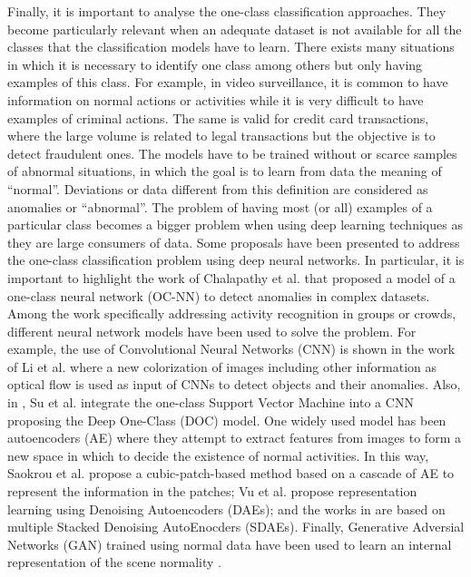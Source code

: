 Finally, it is important to analyse the one-class classification approaches. They become particularly relevant when an adequate dataset is not available for all the classes that the classification models have to learn. There exists many situations in which it is necessary to identify one class among others but only having examples of this class. For example, in video surveillance, it is common to have information on normal actions or activities while it is very difficult to have examples of criminal actions. The same is valid for credit card transactions, where the large volume is related to legal transactions but the objective is to detect fraudulent ones. The models have to be trained without or scarce samples of abnormal situations, in which the goal is to learn from data the meaning of “normal”. Deviations or data different from this definition are considered as anomalies or “abnormal”. The problem of having most (or all) examples of a particular class becomes a bigger problem when using deep learning techniques as they are large consumers of data. Some proposals have been presented to address the one-class classification problem using deep neural networks. In particular, it is important to highlight the work of Chalapathy et al. \cite{chalapathy2019deep} that proposed a model of a one-class neural network (OC-NN) to detect anomalies in complex datasets. Among the work specifically addressing activity recognition in groups or crowds, different neural network models have been used to solve the problem. For example, the use of Convolutional Neural Networks (CNN) is shown in the work of Li et al. \cite{li2019object} where a new colorization of images including other information as optical flow is used as input of CNNs to detect objects and their anomalies. Also, in \cite{su2021deep}, Su et al. integrate the one-class Support Vector Machine into a CNN proposing the Deep One-Class (DOC) model. One widely used model has been autoencoders (AE) where they attempt to extract features from images to form a new space in which to decide the existence of normal activities. In this way, Saokrou et al. \cite{sabokrou2017fast} propose a cubic-patch-based method based on a cascade of AE to represent the information in the patches; Vu et al. \cite{vu2019robust} propose representation learning using Denoising Autoencoders (DAEs); and the works in \cite{xu2015learning,xu2017detecting} are based on multiple Stacked Denoising AutoEnocders (SDAEs). Finally, Generative Adversial Networks (GAN) trained using normal data have been used to learn an internal representation of the scene normality \cite{ravanbakhsh2017abnormal,ravanbakhsh2019training}.
